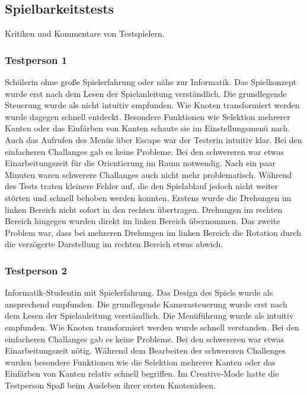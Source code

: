 %



\newpage



\label{Abschnitt:Tests:Protokoll:Abnahme}



\subsection*{Spielbarkeitstests}

Kritiken und Kommentare von Testspielern.\\



\subsubsection*{Testperson 1}

Schülerin ohne große Spielerfahrung oder nähe zur Informatik. Das Spielkonzept wurde erst nach dem Lesen der Spielanleitung verständlich. Die grundlegende Steuerung wurde als nicht intuitiv empfunden. Wie Knoten transformiert werden wurde dagegen schnell entdeckt. Besondere Funktionen wie Selektion mehrerer Kanten oder das Einfärben von Kanten schaute sie im Einstellungsmenü nach. Auch das Aufrufen des Menüs über Escape war der Testerin intuitiv klar. Bei den einfacheren Challanges gab es keine Probleme. Bei den schwereren war etwas Einarbeitungszeit für die Orientierung im Raum notwendig. Nach ein paar Minuten waren schwerere Challanges auch nicht mehr problematisch. Während des Tests traten kleinere Fehler auf, die den Spielablauf jedoch nicht weiter störten und schnell behoben werden konnten. Erstens wurde die Drehungen im linken Bereich nicht sofort in den rechten übertragen. Drehungen im rechten Bereich hingegen wurden direkt im linken Bereich übernommen. Das zweite Problem war, dass bei mehreren Drehungen im linken Bereich die Rotation durch die verzögerte Darstellung im rechten Bereich etwas abwich.

\subsubsection*{Testperson 2}

Informatik-Studentin mit Spielerfahrung. Das Design des Spiels wurde als ansprechend empfunden. Die grundlegende Kamerasteuerung wurde erst nach dem Lesen der Spielanleitung verständlich. Die Menüführung wurde als intuitiv empfunden. Wie Knoten transformiert werden wurde schnell verstanden. Bei den einfacheren Challanges gab es keine Probleme. Bei den schwereren war etwas Einarbeitungszeit nötig. Während dem Bearbeiten der schwereren Challenges wurden besondere Funktionen wie die Selektion mehrerer Kanten oder das Einfärben von Kanten relativ schnell begriffen. Im Creative-Mode hatte die Testperson Spaß beim Ausleben ihrer ersten Knotenideen.






